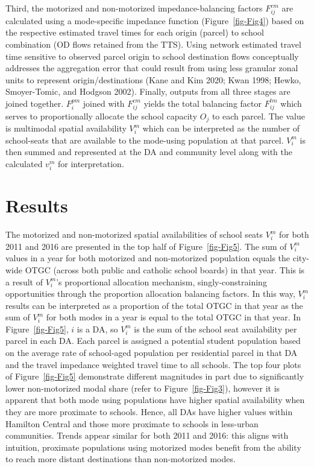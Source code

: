 \documentclass[
default
]{sn-jnl}
\begin{document}
Third, the motorized and non-motorized impedance-balancing factors
\(F_{ij}^{cm}\) are calculated using a mode-specific impedance function
(Figure~\ref{fig-Fig4}) based on the respective estimated travel times
for each origin (parcel) to school combination (OD flows retained from
the TTS). Using network estimated travel time sensitive to observed
parcel origin to school destination flows conceptually addresses the
aggregation error that could result from using less granular zonal units
to represent origin/destinations (Kane and Kim 2020; Kwan 1998; Hewko,
Smoyer-Tomic, and Hodgson 2002). Finally, outputs from all three stages
are joined together. \(F_{i}^{pm}\) joined with \(F_{ij}^{cm}\) yields
the total balancing factor \(F^{tm}_{ij}\) which serves to
proportionally allocate the school capacity \(O_j\) to each parcel. The
value is multimodal spatial availability \(V_i^m\) which can be
interpreted as the number of school-seats that are available to the
mode-using population at that parcel. \(V_i^m\) is then summed and
represented at the DA and community level along with the calculated
\(v_i^m\) for interpretation.

\section{Results}\label{results}

The motorized and non-motorized spatial availabilities of school seats
\(V_i^m\) for both 2011 and 2016 are presented in the top half of
Figure~\ref{fig-Fig5}. The sum of \(V_i^m\) values in a year for both
motorized and non-motorized population equals the city-wide OTGC (across
both public and catholic school boards) in that year. This is a result
of \(V_i^m\)'s proportional allocation mechanism, singly-constraining
opportunities through the proportion allocation balancing factors. In
this way, \(V_i^m\) results can be interpreted as a proportion of the
total OTGC in that year as the sum of \(V_i^m\) for both modes in a year
is equal to the total OTGC in that year. In Figure~\ref{fig-Fig5}, \(i\)
is a DA, so \(V_i^m\) is the sum of the school seat availability per
parcel in each DA. Each parcel is assigned a potential student
population based on the average rate of school-aged population per
residential parcel in that DA and the travel impedance weighted travel
time to all schools. The top four plots of Figure~\ref{fig-Fig5}
demonstrate different magnitudes in part due to significantly lower
non-motorized modal share (refer to Figure~\ref{fig-Fig3}), however it
is apparent that both mode using populations have higher spatial
availability when they are more proximate to schools. Hence, all DAs
have higher values within Hamilton Central and those more proximate to
schools in less-urban communities. Trends appear similar for both 2011
and 2016: this aligns with intuition, proximate populations using
motorized modes benefit from the ability to reach more distant
destinations than non-motorized modes.
\end{document}
